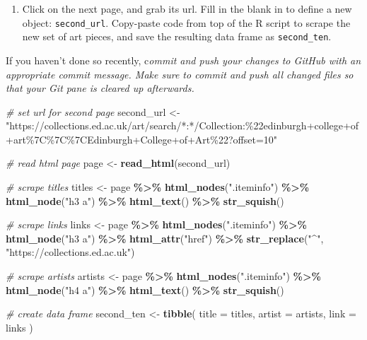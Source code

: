 \documentclass[
]{article}
\newenvironment{Shaded}{\begin{snugshade}}{\end{snugshade}}
\newcommand{\AttributeTok}[1]{\textcolor[rgb]{0.13,0.29,0.53}{#1}}
\newcommand{\CommentTok}[1]{\textcolor[rgb]{0.56,0.35,0.01}{\textit{#1}}}
\newcommand{\FunctionTok}[1]{\textcolor[rgb]{0.13,0.29,0.53}{\textbf{#1}}}
\newcommand{\NormalTok}[1]{#1}
\newcommand{\OtherTok}[1]{\textcolor[rgb]{0.56,0.35,0.01}{#1}}
\newcommand{\SpecialCharTok}[1]{\textcolor[rgb]{0.81,0.36,0.00}{\textbf{#1}}}
\newcommand{\StringTok}[1]{\textcolor[rgb]{0.31,0.60,0.02}{#1}}
\providecommand{\tightlist}{%
  \setlength{\itemsep}{0pt}\setlength{\parskip}{0pt}}
\begin{document}
\begin{enumerate}
\def\labelenumi{\arabic{enumi}.}
\setcounter{enumi}{3}
\tightlist
\item
  Click on the next page, and grab its url. Fill in the blank in to
  define a new object: \texttt{second\_url}. Copy-paste code from top of
  the R script to scrape the new set of art pieces, and save the
  resulting data frame as \texttt{second\_ten}.
\end{enumerate}

If you haven't done so recently, c\emph{ommit and push your changes to
GitHub with an appropriate commit message. Make sure to commit and push
all changed files so that your Git pane is cleared up afterwards.}

\begin{Shaded}
\begin{Highlighting}[]
\CommentTok{\# set url for second page}
\NormalTok{second\_url }\OtherTok{\textless{}{-}} \StringTok{"https://collections.ed.ac.uk/art/search/*:*/Collection:\%22edinburgh+college+of+art\%7C\%7C\%7CEdinburgh+College+of+Art\%22?offset=10"}

\CommentTok{\# read html page}
\NormalTok{page }\OtherTok{\textless{}{-}} \FunctionTok{read\_html}\NormalTok{(second\_url)}

\CommentTok{\# scrape titles}
\NormalTok{titles }\OtherTok{\textless{}{-}}\NormalTok{ page }\SpecialCharTok{\%\textgreater{}\%}
  \FunctionTok{html\_nodes}\NormalTok{(}\StringTok{".iteminfo"}\NormalTok{) }\SpecialCharTok{\%\textgreater{}\%}
  \FunctionTok{html\_node}\NormalTok{(}\StringTok{"h3 a"}\NormalTok{) }\SpecialCharTok{\%\textgreater{}\%}
  \FunctionTok{html\_text}\NormalTok{() }\SpecialCharTok{\%\textgreater{}\%}
  \FunctionTok{str\_squish}\NormalTok{()}

\CommentTok{\# scrape links}
\NormalTok{links }\OtherTok{\textless{}{-}}\NormalTok{ page }\SpecialCharTok{\%\textgreater{}\%}
  \FunctionTok{html\_nodes}\NormalTok{(}\StringTok{".iteminfo"}\NormalTok{) }\SpecialCharTok{\%\textgreater{}\%}
  \FunctionTok{html\_node}\NormalTok{(}\StringTok{"h3 a"}\NormalTok{) }\SpecialCharTok{\%\textgreater{}\%}
  \FunctionTok{html\_attr}\NormalTok{(}\StringTok{"href"}\NormalTok{) }\SpecialCharTok{\%\textgreater{}\%}
  \FunctionTok{str\_replace}\NormalTok{(}\StringTok{"\^{}"}\NormalTok{, }\StringTok{"https://collections.ed.ac.uk"}\NormalTok{)}

\CommentTok{\# scrape artists}
\NormalTok{artists }\OtherTok{\textless{}{-}}\NormalTok{ page }\SpecialCharTok{\%\textgreater{}\%}
  \FunctionTok{html\_nodes}\NormalTok{(}\StringTok{".iteminfo"}\NormalTok{) }\SpecialCharTok{\%\textgreater{}\%}
  \FunctionTok{html\_node}\NormalTok{(}\StringTok{"h4 a"}\NormalTok{) }\SpecialCharTok{\%\textgreater{}\%}
  \FunctionTok{html\_text}\NormalTok{() }\SpecialCharTok{\%\textgreater{}\%}
  \FunctionTok{str\_squish}\NormalTok{()}

\CommentTok{\# create data frame}
\NormalTok{second\_ten }\OtherTok{\textless{}{-}} \FunctionTok{tibble}\NormalTok{(}
  \AttributeTok{title =}\NormalTok{ titles,}
  \AttributeTok{artist =}\NormalTok{ artists,}
  \AttributeTok{link =}\NormalTok{ links}
\NormalTok{)}
\end{Highlighting}
\end{Shaded}
\end{document}
